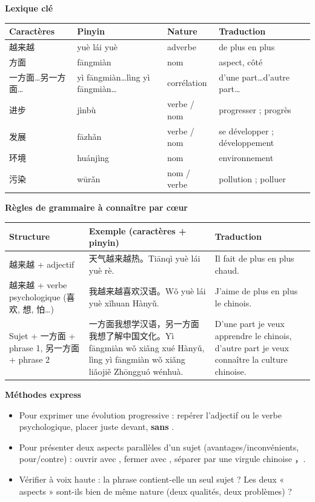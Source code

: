 \documentclass[11pt]{article}
\newcommand{\cle}[1]{{\popxbold\color{popdark}#1}}
\newcommand{\zh}[1]{\ifmmode\text{#1}\else{#1}\fi}
\begin{document}
\begin{bilan}
\textbf{Lexique clé}
\begin{center}
\begin{tabularx}{\linewidth}{|X|X|X|X|}
\hline
\rowcolor{popblueL} Caractères & Pinyin & Nature & Traduction \\
\hline
越来越 & yuè lái yuè & adverbe & de plus en plus \\
\hline
方面 & fāngmiàn & nom & aspect, côté \\
\hline
一方面\ldots 另一方面\ldots & yì fāngmiàn\ldots lìng yì fāngmiàn\ldots & corrélation & d'une part\ldots d'autre part\ldots \\
\hline
进步 & jìnbù & verbe / nom & progresser ; progrès \\
\hline
发展 & fāzhǎn & verbe / nom & se développer ; développement \\
\hline
环境 & huánjìng & nom & environnement \\
\hline
污染 & wūrǎn & nom / verbe & pollution ; polluer \\
\hline
\end{tabularx}
\end{center}

\textbf{Règles de grammaire à connaître par cœur}
\begin{center}
\begin{tabularx}{\linewidth}{|X|X|X|}
\hline
\rowcolor{popblueL} Structure & Exemple (caractères + pinyin) & Traduction \\
\hline
越来越 + adjectif & 天气越来越热。Tiānqì yuè lái yuè rè. & Il fait de plus en plus chaud. \\
\hline
越来越 + verbe psychologique (喜欢, 想, 怕\ldots) & 我越来越喜欢汉语。Wǒ yuè lái yuè xǐhuan Hànyǔ. & J'aime de plus en plus le chinois. \\
\hline
Sujet + 一方面 + phrase 1, 另一方面 + phrase 2 & 一方面我想学汉语，另一方面我想了解中国文化。Yì fāngmiàn wǒ xiǎng xué Hànyǔ, lìng yì fāngmiàn wǒ xiǎng liǎojiě Zhōngguó wénhuà. & D'une part je veux apprendre le chinois, d'autre part je veux connaître la culture chinoise. \\
\hline
\end{tabularx}
\end{center}

\textbf{Méthodes express}
\begin{itemize}
\item Pour exprimer une \cle{évolution progressive} : repérer l'adjectif ou le verbe psychologique, placer \zh{越来越} juste devant, \textbf{sans} \zh{很}.
\item Pour présenter \cle{deux aspects parallèles} d'un sujet (avantages/inconvénients, pour/contre) : ouvrir avec \zh{一方面}, fermer avec \zh{另一方面}, séparer par une virgule chinoise ，.
\item Vérifier à voix haute : la phrase contient-elle un seul sujet ? Les deux « aspects » sont-ils bien de même nature (deux qualités, deux problèmes) ?
\end{itemize}
\end{bilan}
\end{document}
